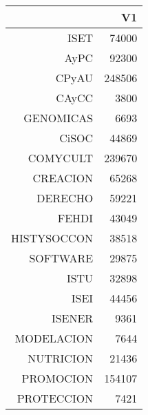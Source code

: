\begin{table}[ht]
\centering
\begin{tabular}{rr}
  \hline
 & V1 \\ 
  \hline
ISET & 74000 \\ 
  AyPC & 92300 \\ 
  CPyAU & 248506 \\ 
  CAyCC & 3800 \\ 
  GENOMICAS & 6693 \\ 
  CiSOC & 44869 \\ 
  COMYCULT & 239670 \\ 
  CREACION & 65268 \\ 
  DERECHO & 59221 \\ 
  FEHDI & 43049 \\ 
  HISTYSOCCON & 38518 \\ 
  SOFTWARE & 29875 \\ 
  ISTU & 32898 \\ 
  ISEI & 44456 \\ 
  ISENER & 9361 \\ 
  MODELACION & 7644 \\ 
  NUTRICION & 21436 \\ 
  PROMOCION & 154107 \\ 
  PROTECCION & 7421 \\ 
   \hline
\end{tabular}
\end{table}
